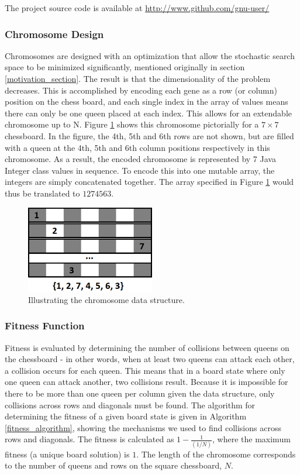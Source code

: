 \documentclass{sig-alternate}
\begin{document}
The project source code is available at \url{http://www.github.com/gnu-user/}

\subsubsection{Chromosome Design}
Chromosomes are designed with an optimization that allow the stochastic search space to be minimized significantly, mentioned originally in section \ref{motivation_section}. The result is that the dimensionality of the problem decreases. This is accomplished by encoding each gene as a row (or column) position on the chess board, and each single index in the array of values means there can only be one queen placed at each index. This allows for an extendable chromosome up to N. Figure \ref{fig:chromosome} shows this chromosome pictorially for a $7 \times 7$ chessboard. In the figure, the 4th, 5th and 6th rows are not shown, but are filled with a queen at the 4th, 5th and 6th column positions respectively in this chromosome. As a result, the encoded chromosome is represented by 7 Java Integer class values in sequence. To encode this into one mutable array, the integers are simply concatenated together. The array specified in Figure \ref{fig:chromosome} would thus be translated to $1274563$.

\begin{figure}\label{fig:chromosome}
\includegraphics[width=0.5\textwidth]{chromosome.png}
\caption{Illustrating the chromosome data structure.}
\end{figure}

\subsubsection{Fitness Function}
Fitness is evaluated by determining the number of collisions between queens on the chessboard - in other words, when at least two queens can attack each other, a collision occurs for each queen. This means that in a board state where only one queen can attack another, two collisions result. Because it is impossible for there to be more than one queen per column given the data structure, only collisions across rows and diagonals must be found. The algorithm for determining the fitness of a given board state is given in Algorithm \ref{fitness_algorithm}, showing the mechanisms we used to find collisions across rows and diagonals. The fitness is calculated as $1 - \frac{1}{(1/N)}$, where the maximum fitness (a unique board solution) is $1$. The length of the chromosome corresponds to the number of queens and rows on the square chessboard, $N$.
 
\end{document}
